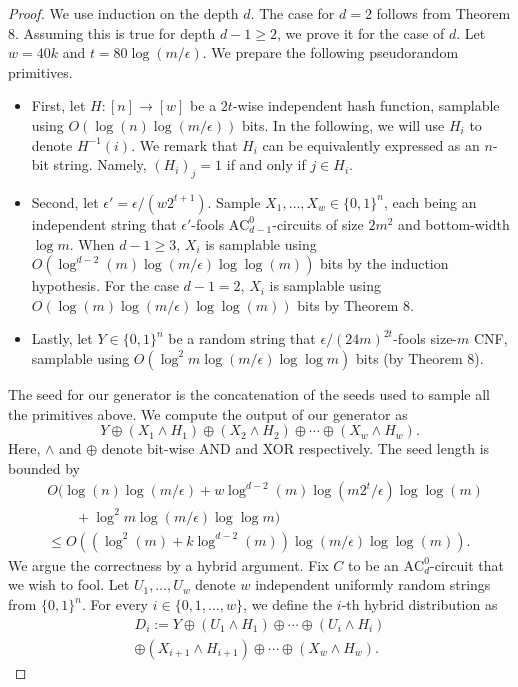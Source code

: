 \begin{proof}We use induction on the depth $d$. The case for $d=2$ follows from Theorem 8. Assuming this is true for depth $d-1\ge2$, we prove it for the case of $d$. Let $w=40k$ and $t=80\log(m/\epsilon)$. We prepare the following pseudorandom primitives.
\begin{itemize}\item First, let $H:[n]\to[w]$ be a $2t$-wise independent hash function, samplable using $O(\log(n)\log(m/\epsilon))$ bits. In the following, we will use $H_i$ to denote $H^{-1}(i)$. We remark that $H_i$ can be equivalently expressed as an $n$-bit string. Namely, $(H_i)_j=1$ if and only if $j\in H_i$.
\item Second, let $\epsilon'=\epsilon/(w2^{t+1})$. Sample $X_1,\ldots,X_w\in\{0,1\}^n$, each being an independent string that $\epsilon'$-fools $\mathrm{AC}^0_{d-1}$-circuits of size $2m^2$ and bottom-width $\log m$. When $d-1\ge3$, $X_i$ is samplable using $O(\log^{d-2}(m)\log(m/\epsilon)\log\log(m))$ bits by the induction hypothesis. For the case $d-1=2$, $X_i$ is samplable using $O(\log(m)\log(m/\epsilon)\log\log(m))$ bits by Theorem 8.
\item Lastly, let $Y\in\{0,1\}^n$ be a random string that $\epsilon/(24m)^{2t}$-fools size-$m$ CNF, samplable using $O(\log^2m\log(m/\epsilon)\log\log m)$ bits (by Theorem 8).\end{itemize}
The seed for our generator is the concatenation of the seeds used to sample all the primitives above. We compute the output of our generator as
\[Y\oplus(X_1\land H_1)\oplus(X_2\land H_2)\oplus\cdots\oplus(X_w\land H_w).\tag{1}\]
Here, $\land$ and $\oplus$ denote bit-wise AND and XOR respectively. The seed length is bounded by
\begin{align*}&O(\log(n)\log(m/\epsilon)+w\log^{d-2}(m)\log(m2^t/\epsilon)\log\log(m)\\&\qquad+\log^2m\log(m/\epsilon)\log\log m)\\&\le O((\log^2(m)+k\log^{d-2}(m))\log(m/\epsilon)\log\log(m)).\end{align*}
We argue the correctness by a hybrid argument. Fix $C$ to be an $\mathrm{AC}^0_d$-circuit that we wish to fool. Let $U_1,\ldots,U_w$ denote $w$ independent uniformly random strings from $\{0,1\}^n$. For every $i\in\{0,1,\ldots,w\}$, we define the $i$-th hybrid distribution as
\begin{multline*}D_i:=Y\oplus(U_1\land H_1)\oplus\cdots\oplus(U_i\land H_i)\\\oplus(X_{i+1}\land H_{i+1})\oplus\cdots\oplus(X_w\land H_w).\tag{2}\end{multline*}

\end{proof}
